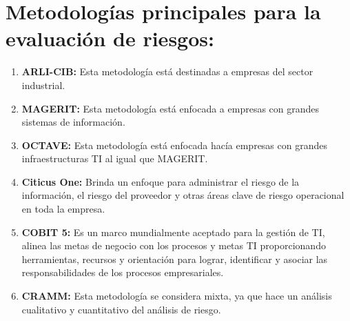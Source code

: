 \section{Metodologías principales para la evaluación de riesgos:}

\begin{enumerate}
\item {\bfseries ARLI-CIB:}
Esta metodología está destinadas a empresas del sector industrial.
\item {\bfseries MAGERIT:}
Esta metodología está enfocada a empresas con grandes sistemas de información.
\item {\bfseries OCTAVE:}
Esta metodología está enfocada hacía empresas con grandes infraestructuras TI al igual que MAGERIT.
\item {\bfseries Citicus One:}
Brinda un enfoque para administrar el riesgo de la información, el riesgo del proveedor y otras áreas clave de riesgo operacional en toda la empresa.
\item {\bfseries COBIT 5:}
Es un marco mundialmente aceptado para la gestión de TI, alinea las metas de negocio con los procesos y metas TI proporcionando herramientas, recursos y orientación para lograr, identificar y asociar las responsabilidades de los procesos  empresariales.
\item {\bfseries CRAMM:}
Esta metodología se considera mixta, ya que hace un análisis cualitativo y cuantitativo del análisis de riesgo.
\end{enumerate}




